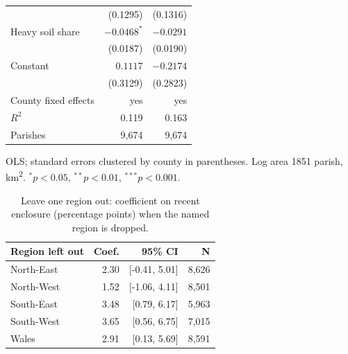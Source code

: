 \documentclass[11pt,a4paper]{article}
\begin{document}
\begin{table}[tbp]
\begin{tabular}{lrr}
 & (0.1295) & (0.1316)\\
Heavy soil share & $-0.0468^{*}$ & $-0.0291$\\
 & (0.0187) & (0.0190)\\
Constant & $0.1117$ & $-0.2174$\\
 & (0.3129) & (0.2823)\\
\midrule County fixed effects & yes & yes\\ $R^2$ & 0.119 & 0.163\\ Parishes & 9,674 & 9,674\\\bottomrule\end{tabular}\par\vspace{4pt}\parbox{\textwidth}{\footnotesize OLS; standard errors clustered by county in parentheses. Log area 1851 parish, km\textsuperscript{2}. $^{*}p<0.05$, $^{**}p<0.01$, $^{***}p<0.001$.}\end{table}

\begin{table}[tbp]\centering\small\caption{Leave one region out: coefficient on recent enclosure (percentage points) when the named region is dropped.}\label{tab:lor}\begin{tabular}{lrrr}\toprule Region left out & Coef. & 95\% CI & N\\\midrule
North-East & 2.30 & [-0.41, 5.01] & 8,626\\
North-West & 1.52 & [-1.06, 4.11] & 8,501\\
South-East & 3.48 & [0.79, 6.17] & 5,963\\
South-West & 3.65 & [0.56, 6.75] & 7,015\\
Wales & 2.91 & [0.13, 5.69] & 8,591\\
\bottomrule\end{tabular}\end{table}
\end{document}
